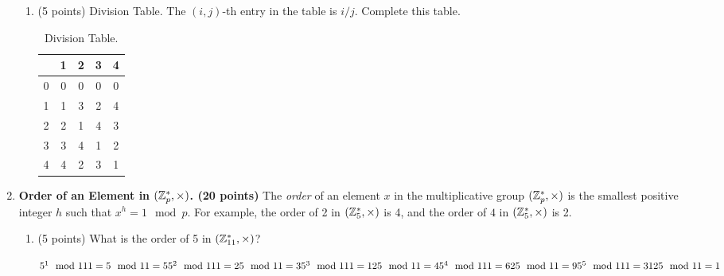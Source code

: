 \documentclass[11pt]{article}
\begin{document}
\begin{enumerate}
\begin{enumerate}
  \item (5 points) Division Table. 
    The $(i,j)$-th entry in the table is $i/ j$. 
    Complete this table. 
  
    \begin{table}[H]
    \begin{center}
    \begin{tabular}{|c|c|c|c|c|}\hline
      & 1 & 2 & 3 & 4 \\\hline 
    0 & 0 & 0 & 0 & 0 \\\hline
    1 & 1 & 3 & 2 & 4 \\\hline
    2 & 2 & 1 & 4 & 3 \\\hline
    3 & 3 & 4 & 1 & 2 \\\hline
    4 & 4 & 2 & 3 & 1 \\\hline
    \end{tabular}
    \end{center}
    \caption{Division Table.}
    \end{table}
  
  \end{enumerate} 




\newpage
\item {\bfseries Order of an Element in $({\mathbb Z}_p^*,\times)$. (20 points)} The \textit{order} of an element $x$ in the multiplicative group $({\mathbb Z}_p^*,\times)$ is the smallest positive integer $h$ such that $x^h = 1 \mod p $. For example, the order of 2 in $({\mathbb Z}_5^*,\times)$ is 4, and the order of $4$ in $({\mathbb Z}_5^*,\times)$ is 2. 
\begin{enumerate}
    \item (5 points) What is the order of 5 in $({\mathbb Z}_{11}^*,\times)$? \newline
  {\bfseries
      \newline
      \newline
      $5^1\mod111 = 5\mod 11 = 5 \newline
      5^2\mod 111 = 25\mod 11 = 3 \newline
      5^3\mod 111 = 125\mod 11 = 4 \newline
      5^4\mod 111 = 625\mod 11 = 9 \newline
      5^5\mod 111 = 3125\mod 11 = 1$ \newline

}
\end{enumerate}
\end{enumerate}
\end{document}

